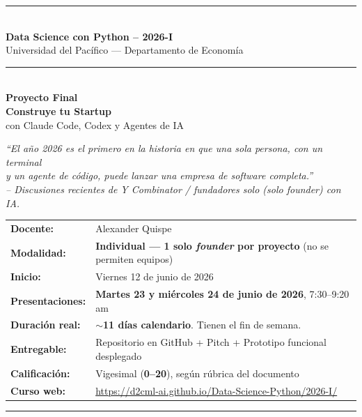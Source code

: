 \documentclass[11pt,a4paper]{article}
\begin{document}
\begin{titlepage}
\centering
\vspace*{1.2cm}
{\color{clawOrange}\rule{\linewidth}{2pt}}\\[6pt]
{\Large\bfseries\color{clawDark} Data Science con Python -- 2026-I}\\[2pt]
{\small\color{clawGray} Universidad del Pac\'ifico --- Departamento de Econom\'ia}\\[4pt]
{\color{clawOrange}\rule{\linewidth}{0.6pt}}\\[28pt]

{\Huge\bfseries\color{clawDark} Proyecto Final}\\[10pt]
{\LARGE\bfseries\color{clawOrange} Construye tu Startup}\\[6pt]
{\large\color{clawDark} con Claude Code, Codex y Agentes de IA}\\[34pt]

\begin{tcolorbox}[enhanced, colback=clawLight, colframe=clawDark,
  boxrule=0.6pt, arc=2pt, width=0.85\linewidth, halign=center]
\itshape\color{clawDark}
``El a\~no 2026 es el primero en la historia en que una sola persona, con un terminal\\
y un agente de c\'odigo, puede lanzar una empresa de software completa.''\\[3pt]
{\small\color{clawGray} -- Discusiones recientes de Y Combinator / fundadores solo (\emph{solo founder}) con IA.}
\end{tcolorbox}

\vfill

\begin{tabularx}{0.85\linewidth}{@{}lX@{}}
\textbf{Docente:}      & Alexander Quispe \\
\textbf{Modalidad:}    & \textbf{Individual --- 1 solo \emph{founder} por proyecto} (no se permiten equipos) \\
\textbf{Inicio:}       & Viernes 12 de junio de 2026 \\
\textbf{Presentaciones:} & \textbf{Martes 23 y mi\'ercoles 24 de junio de 2026}, 7:30--9:20\,am \\
\textbf{Duraci\'on real:} & \textbf{$\sim$11 d\'ias calendario}. Tienen el fin de semana. \\
\textbf{Entregable:}   & Repositorio en GitHub + Pitch + Prototipo funcional desplegado \\
\textbf{Calificaci\'on:} & Vigesimal (\textbf{0--20}), seg\'un r\'ubrica del documento \\
\textbf{Curso web:}    & \url{https://d2cml-ai.github.io/Data-Science-Python/2026-I/} \\
\end{tabularx}

\vspace{0.6cm}
{\color{clawOrange}\rule{\linewidth}{2pt}}
\end{titlepage}
\end{document}
